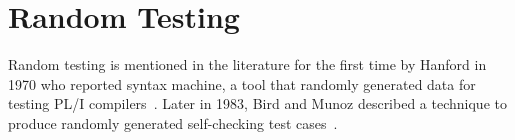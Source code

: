\section{Random Testing} \label{sec:randomTesting}
Random testing is mentioned in the literature for the first time by Hanford in 1970 who reported syntax machine, a tool that randomly generated data for testing PL/I compilers~\cite{hanford1970automatic}. Later in 1983, Bird and Munoz described a technique to produce randomly generated self-checking test cases~\cite{bird1983automatic}. 
